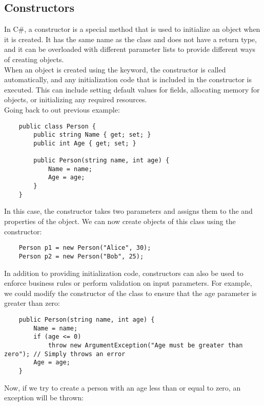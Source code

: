 \documentclass{report}
\begin{document}
\subsection{Constructors}

In C\#, a constructor is a special method that is used to initialize an object when it is created. It has the same name as the class and does not have a return type, and it can be overloaded with different parameter lists to provide different ways of creating objects.\\

When an object is created using the  keyword, the constructor is called automatically, and any initialization code that is included in the constructor is executed. This can include setting default values for fields, allocating memory for objects, or initializing any required resources.\\

Going back to out previous example:
\begin{verbatim}
    public class Person {
        public string Name { get; set; }
        public int Age { get; set; }

        public Person(string name, int age) {
            Name = name;
            Age = age;
        }
    }
\end{verbatim}

In this case, the constructor takes two parameters and assigns them to the  and  properties of the object. We can now create objects of this class using the constructor:

\begin{verbatim}
    Person p1 = new Person("Alice", 30);
    Person p2 = new Person("Bob", 25);
\end{verbatim}

In addition to providing initialization code, constructors can also be used to enforce business rules or perform validation on input parameters. For example, we could modify the constructor of the  class to ensure that the age parameter is greater than zero:

\begin{verbatim}
    public Person(string name, int age) {
        Name = name;
        if (age <= 0)
            throw new ArgumentException("Age must be greater than zero"); // Simply throws an error
        Age = age;
    }
\end{verbatim}

Now, if we try to create a person with an age less than or equal to zero, an exception will be thrown:
\end{document}
